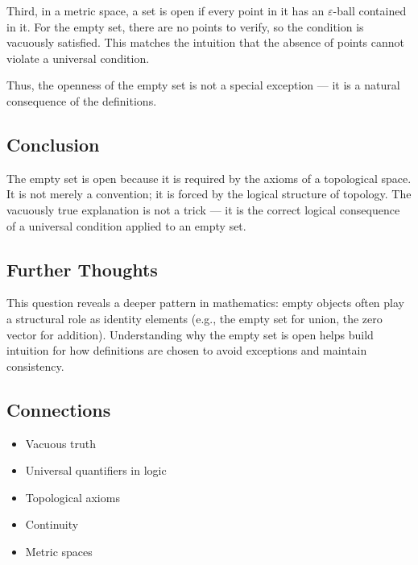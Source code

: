 Third, in a metric space, a set is open if every point in it has an $\varepsilon$-ball contained in it. For the empty set, there are no points to verify, so the condition is vacuously satisfied. This matches the intuition that the absence of points cannot violate a universal condition.

Thus, the openness of the empty set is not a special exception — it is a natural consequence of the definitions.

\subsection*{Conclusion}
The empty set is open because it is required by the axioms of a topological space. It is not merely a convention; it is forced by the logical structure of topology. The vacuously true explanation is not a trick — it is the correct logical consequence of a universal condition applied to an empty set.

\subsection*{Further Thoughts}
This question reveals a deeper pattern in mathematics: empty objects often play a structural role as identity elements (e.g., the empty set for union, the zero vector for addition). Understanding why the empty set is open helps build intuition for how definitions are chosen to avoid exceptions and maintain consistency.
\subsection*{Connections}

\begin{itemize}
\item Vacuous truth
\item Universal quantifiers in logic
\item Topological axioms
\item Continuity
\item Metric spaces
\end{itemize}
 